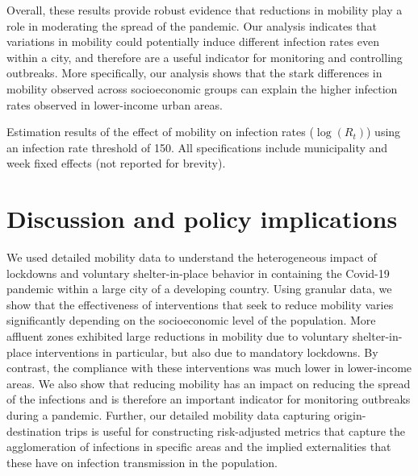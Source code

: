 
Overall, these results provide robust evidence that reductions in mobility play a role in moderating the spread of the pandemic. Our analysis indicates that variations in mobility could potentially induce different infection rates even within a city, and therefore are a useful indicator for monitoring and controlling outbreaks. More specifically, our analysis shows that the stark differences in mobility observed across socioeconomic groups can explain the higher infection rates observed in lower-income urban areas.

\begin{table}[!htbp] 
    \centering
    \caption{Estimation results of the effect of mobility on infection rates ($\log(R_t)$) using an infection rate threshold of 150. All specifications include municipality and week fixed effects (not reported for brevity).}
    
    \label{tab:main_mobRt_results1} 
\end{table}


\section{Discussion and policy implications}

We used detailed mobility data to understand the heterogeneous impact of lockdowns and voluntary shelter-in-place behavior in containing the Covid-19 pandemic within a large city of a developing country. Using granular data, we show that the effectiveness of interventions that seek to reduce mobility varies significantly depending on the socioeconomic level of the population.  More affluent zones exhibited large reductions in mobility due to voluntary shelter-in-place interventions in particular, but also due to mandatory lockdowns. By contrast, the compliance with these interventions was much lower in lower-income areas. We also show that reducing mobility has an impact on reducing the spread of the infections and is therefore an important indicator for monitoring outbreaks during a pandemic. Further, our detailed mobility data capturing origin-destination trips is useful for constructing risk-adjusted metrics that capture the agglomeration of infections in specific areas and the implied externalities that these have on infection transmission in the population.

